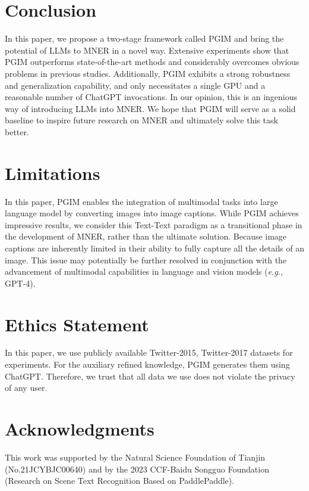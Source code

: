 \documentclass[11pt]{article}
\begin{document}
\section{Conclusion}
In this paper, we propose a two-stage framework called PGIM and bring the potential of LLMs to MNER in a novel way. 
Extensive experiments show that PGIM outperforms state-of-the-art methods and considerably overcomes obvious problems in previous studies. 
Additionally, PGIM exhibits a strong robustness and generalization capability, and only necessitates a single GPU and a reasonable number of ChatGPT invocations. 
In our opinion, this is an ingenious way of introducing LLMs into MNER. 
We hope that PGIM will serve as a solid baseline to inspire future research on MNER and ultimately solve this task better.

\section*{Limitations}
In this paper, PGIM enables the integration of multimodal tasks into large language model by converting images into image captions. While PGIM achieves impressive results, we consider this Text-Text paradigm as a transitional phase in the development of MNER, rather than the ultimate solution. Because image captions are inherently limited in their ability to fully capture all the details of an image. This issue may potentially be further resolved in conjunction with the advancement of multimodal capabilities in language and vision models (\emph{e.g.}, GPT-4).


\section*{Ethics Statement}
In this paper, we use publicly available Twitter-2015, Twitter-2017 datasets for experiments. For the auxiliary refined knowledge, PGIM generates them using ChatGPT. Therefore, we trust that all data we use does not violate the privacy of any user.

\section*{Acknowledgments}
This work was supported by the Natural Science Foundation of Tianjin (No.21JCYBJC00640) and by the 2023 CCF-Baidu Songguo Foundation (Research on Scene Text Recognition Based on PaddlePaddle).



\end{document}
